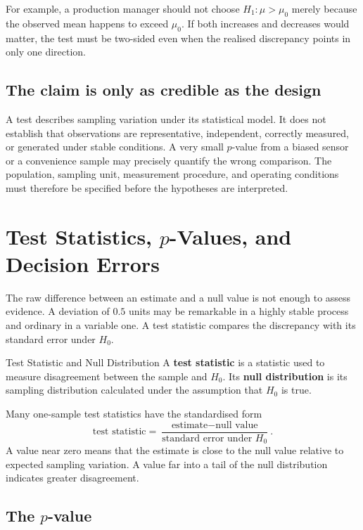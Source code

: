 For example, a production manager should not choose $H_1:\mu>\mu_0$ merely because the observed mean happens to exceed $\mu_0$. If both increases and decreases would matter, the test must be two-sided even when the realised discrepancy points in only one direction.

\subsection{The claim is only as credible as the design}

A test describes sampling variation under its statistical model. It does not establish that observations are representative, independent, correctly measured, or generated under stable conditions. A very small $p$-value from a biased sensor or a convenience sample may precisely quantify the wrong comparison. The population, sampling unit, measurement procedure, and operating conditions must therefore be specified before the hypotheses are interpreted.

\section{Test Statistics, \texorpdfstring{$p$}{p}-Values, and Decision Errors}
\label{sec:test-statistics-pvalues-errors}

The raw difference between an estimate and a null value is not enough to assess evidence. A deviation of $0.5$ units may be remarkable in a highly stable process and ordinary in a variable one. A test statistic compares the discrepancy with its standard error under $H_0$.

\begin{definition}{Test Statistic and Null Distribution}
A \textbf{test statistic} is a statistic used to measure disagreement between the sample and $H_0$. Its \textbf{null distribution} is its sampling distribution calculated under the assumption that $H_0$ is true.
\end{definition}

Many one-sample test statistics have the standardised form
\[
\text{test statistic}
=
\frac{\text{estimate}-\text{null value}}
     {\text{standard error under }H_0}.
\]
A value near zero means that the estimate is close to the null value relative to expected sampling variation. A value far into a tail of the null distribution indicates greater disagreement.

\subsection{The $p$-value}

